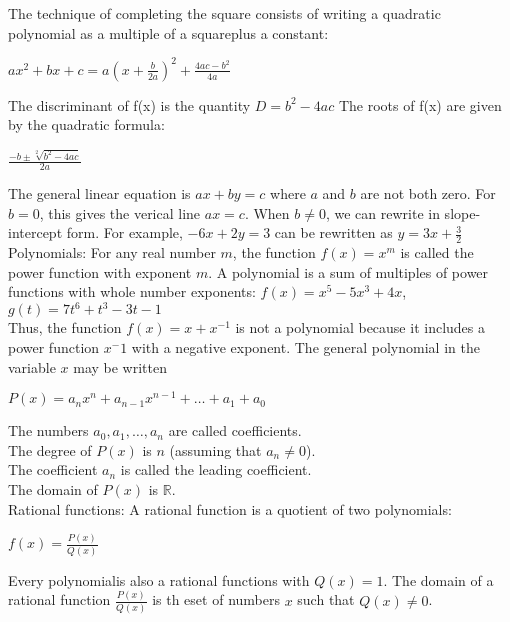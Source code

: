 \documentclass{article}
\begin{document}
The technique of completing the square consists of writing a quadratic polynomial as a multiple of a squareplus a constant:\\
\begin{center}$ax^2 + bx + c = a(x + \frac{b}{2a})^2 + \frac{4ac-b^2}{4a}$\\\end{center}

The discriminant of f(x) is the quantity $D = b^2 - 4ac$ The roots of f(x) are given by the quadratic formula:\\
\begin{center}$\frac{-b \pm \sqrt[2]{b^2 - 4ac}}{2a}$ \end{center}

The general linear equation is $ax + by = c$ where $a$ and $b$ are not both zero. For $b = 0$, this gives the verical line $ax = c$. When $b \neq 0$, we can rewrite in slope-intercept form. For example, $-6x + 2y =3$ can be rewritten as $y = 3x + \frac{3}{2}$\\

Polynomials: For any real number $m$, the function $f(x) = x^m$ is called the power function with exponent $m$. A polynomial is a sum of multiples of power functions with whole number exponents: $f(x) = x^5 -5x^3 + 4x$, $g(t) = 7t^6 +t^3 - 3t -1$\\

Thus, the function $f(x) = x + x^{-1}$ is not a polynomial because it includes a power function $x^-1$ with a negative exponent. The general polynomial in the variable $x$ may be written\\
\begin{center}$P(x) = a_nx^n + a_{n-1}x^{n-1} + \dots + a_1 + a_0$\end{center}
The numbers $a_0, a_1, \dots, a_n$ are called coefficients.\\
The degree of $P(x)$ is $n$ (assuming that $a_n \neq 0$).\\
The coefficient $a_n$ is called the leading coefficient.\\
The domain of $P(x)$ is $\mathbb{R}$.\\

Rational functions: A rational function is a quotient of two polynomials:\\
\begin{center}$f(x) = \frac{P(x)}{Q(x)}$\end{center}
Every polynomialis also a rational functions with $Q(x) = 1$. The domain of a rational function $\frac{P(x)}{Q(x)}$ is th eset of numbers $x$ such that $Q(x) \neq 0$.\\
\end{document}
